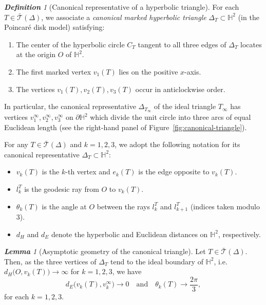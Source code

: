 \documentclass[11pt, letterpaper]{amsart}
\theoremstyle{definition}
\theoremstyle{remark}
\newtheorem{lemma}[theorem]{\rm\bf Lemma}
\newtheorem{definition}[theorem]{\rm\bf Definition}
\newcommand{\cT}{\mathcal{T}}
\newcommand{\bH}{\mathbb{H}}
\newcommand{\DEF}{} \newcommand{\WARN}{\textcolor{red}} \newcommand{\ALT}{\textcolor{brown}} \newcommand{\TODO}{\textcolor{teal}} %
\numberwithin{equation}{section}
\begin{document}
\begin{definition}[Canonical representative of a hyperbolic triangle]
\label{def:canonical-triangles}
For each \(T\in\bar{\cT}(\Delta)\), we associate a \DEF{\em canonical marked hyperbolic triangle} \(\Delta_T\subset\bH^2\) (in the Poincar\'e disk model) satisfying:
\begin{enumerate}
  \item The center of the hyperbolic circle \(C_T\) tangent to all three edges of \(\Delta_T\) locates at the origin \(O\) of \(\bH^2\).
  \item The first marked vertex \(v_1(T)\) lies on the positive \(x\)-axis.
  \item The vertices \(v_1(T),v_2(T),v_3(T)\) occur in anticlockwise order.
\end{enumerate}

In particular, the canonical representative \(\Delta_{T_{\infty}}\) of the ideal triangle \(T_{\infty}\) has vertices \(v^{\infty}_1,v^{\infty}_2,v^{\infty}_3\) on \(\partial\bH^2\) which divide the unit circle into three arcs of equal Euclidean length (see the right-hand panel of Figure~\ref{fig:canonical-triangle}).

For any \(T\in\bar{\cT}(\Delta)\) and \(k=1,2,3\), we adopt the following notation for its canonical representative \(\Delta_T\subset\bH^2\):
\begin{itemize}
  \item \(v_k(T)\) is the \(k\)-th vertex and \(e_k(T)\) is the edge opposite to \(v_k(T)\).
  \item \(l_k^T\) is the geodesic ray from \(O\) to \(v_k(T)\).
  \item \(\theta_k(T)\) is the angle at \(O\) between the rays \(l_k^T\) and \(l_{k+1}^T\) (indices taken modulo \(3\)).
  \item \(d_H\) and \(d_E\) denote the hyperbolic and Euclidean distances on \(\bH^2\), respectively.
\end{itemize}
\end{definition}


\begin{lemma}[Asymptotic geometry of the canonical triangle]
\label{lm:estimate.triangle}
Let \(T\in\bar{\cT}(\Delta)\). Then, as the three vertices of \(\Delta_T\) tend to the ideal boundary of \(\bH^2\), i.e.
\(d_H\bigl(O,v_k(T)\bigr)\to\infty \) for \(k=1,2,3\), we have
\[
d_E\bigl(v_k(T),v_k^{\infty}\bigr)\to 0\quad \text{and} \quad
\theta_k(T)\to \frac{2\pi}{3},
\]
for each \(k=1,2,3\).
\end{lemma}
\end{document}
